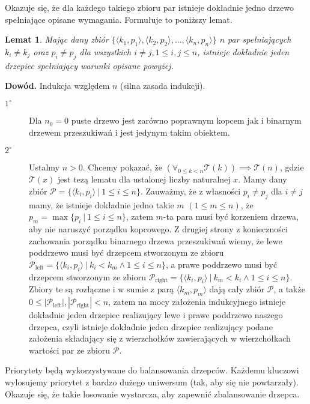 \documentclass[declaration,shortabstract]{iithesis}
\theoremstyle{definition} \newtheorem{definition}{Definicja}[chapter]
\theoremstyle{remark} \newtheorem{remark}[definition]{Obserwacja}
\theoremstyle{plain} \newtheorem{theorem}[definition]{Twierdzenie}
\theoremstyle{remark} \newtheorem{example}{Przykład}[definition]
\theoremstyle{plain} \newtheorem{lemma}[definition]{Lemat}
\begin{document}
Okazuje się, że dla każdego takiego zbioru par istnieje dokładnie jedno drzewo spełniające opisane wymagania. Formułuje to poniższy lemat.

\begin{lemma}
    Mając dany zbiór $\{ \langle k_1, p_1 \rangle, \langle k_2, p_2 \rangle, \ldots, \langle k_n, p_n \rangle \}$ $n$ par spełniających $k_i \neq k_j$ oraz $p_i \neq p_j$ dla wszystkich $i \neq j, 1 \leq i, j \leq n$, istnieje dokładnie jeden drzepiec spełniający warunki opisane powyżej.
\end{lemma}

\noindent
\textbf{Dowód.} Indukcja względem $n$ (silna zasada indukcji).
\begin{description}
    \item[$1^\circ$] Dla $n_0 = 0$ puste drzewo jest zarówno poprawnym kopcem jak i binarnym drzewem przeszukiwań i jest jedynym takim obiektem.
    \item[$2^\circ$] Ustalmy $n > 0$. Chcemy pokazać, że $(\forall_{0 \leq k < n} \mathcal{T}(k)) \implies \mathcal{T}(n)$, gdzie $\mathcal{T}(x)$ jest tezą lematu dla ustalonej liczby naturalnej $x$. Mamy dany zbiór $\mathcal{P} = \{ \langle k_i, p_i \rangle \ | \ 1 \leq i \leq n \}$. Zauważmy, że z własności $p_i \neq p_j$ dla $i \neq j$ mamy, że istnieje dokładnie jedno takie $m$ $(1 \leq m \leq n)$, że $p_m = \max \{p_i \ |\ 1 \leq i \leq n \}$, zatem $m$-ta para musi być korzeniem drzewa, aby nie naruszyć porządku kopcowego. Z drugiej strony z konieczności zachowania porządku binarnego drzewa przeszukiwań wiemy, że lewe poddrzewo musi być drzepcem stworzonym ze zbioru $\mathcal{P}_{\text{left}} = \{ \langle k_i, p_i \rangle \ |\ k_i < k_m \land 1 \leq i \leq n \}$, a prawe poddrzewo musi być drzepcem stworzonym ze zbioru $\mathcal{P}_{\text{right}} = \{ \langle k_i, p_i \rangle\ |\ k_m < k_i \land 1 \leq i \leq n \}$. Zbiory te są rozłączne i w sumie z parą $\langle k_m, p_m \rangle$ dają cały zbiór $\mathcal{P}$, a także $0 \leq |\mathcal{P}_{\text{left}}|, |\mathcal{P}_{\text{right}}| < n$, zatem na mocy założenia indukcyjnego istnieje dokładnie jeden drzepiec realizujący lewe i prawe poddrzewo naszego drzepca, czyli istnieje dokładnie jeden drzepiec realizujący podane założenia składający się z wierzchołków zawierających w wierzchołkach wartości par ze zbioru $\mathcal{P}$.
\end{description}

Priorytety będą wykorzystywane do balansowania drzepców. Każdemu kluczowi wylosujemy priorytet z bardzo dużego uniwersum (tak, aby się nie powtarzały). Okazuje się, że takie losowanie wystarcza, aby zapewnić zbalansowanie drzepca.
\end{document}
